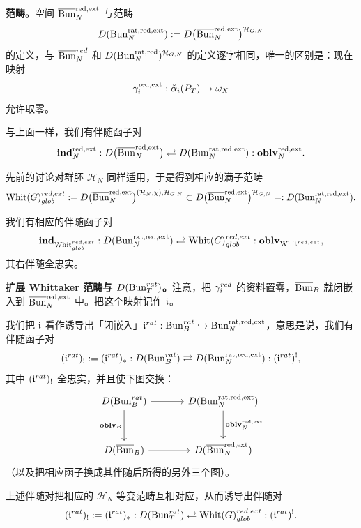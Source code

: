 \textbf{范畴。}空间 $\overline{\operatorname{Bun}}^{\mathrm{red},\mathrm{ext}}_N$ 与范畴
\[
  D(\operatorname{Bun}^{\mathrm{rat},\mathrm{red},\mathrm{ext}}_N)
  := D\bigl(\overline{\operatorname{Bun}}^{\mathrm{red},\mathrm{ext}}_N\bigr)^{\mathcal H_{G,N}}
\]
的定义，与 $\overline{\operatorname{Bun}}^{red}_N$ 和 $D(\operatorname{Bun}^{\mathrm{rat},\mathrm{red}}_N)^{\mathcal H_{G,N}}$ 的定义逐字相同，唯一的区别是：现在映射
\[
  \gamma_i^{\mathrm{red},\mathrm{ext}} : \check\alpha_i(P_T)\to\omega_X
\]
允许取零。

与上面一样，我们有伴随函子对
\[
  \mathbf{ind}_N^{\mathrm{red},\mathrm{ext}} :
  D\bigl(\overline{\operatorname{Bun}}^{\mathrm{red},\mathrm{ext}}_N\bigr)
  \rightleftarrows
  D(\operatorname{Bun}^{\mathrm{rat},\mathrm{red},\mathrm{ext}}_N) : \mathbf{oblv}_N^{\mathrm{red},\mathrm{ext}}.
\]

先前的讨论对群胚 $\mathcal H_N$ 同样适用，于是得到相应的满子范畴
\[
  \mathrm{Whit}(G)^{red,ext}_{glob} :=
  D\bigl(\overline{\operatorname{Bun}}^{\mathrm{red},\mathrm{ext}}_N\bigr)^{(\mathcal H_N,\chi),\mathcal H_{G,N}}
  \subset D\bigl(\overline{\operatorname{Bun}}^{\mathrm{red},\mathrm{ext}}_N\bigr)^{\mathcal H_{G,N}}
  =: D(\operatorname{Bun}^{\mathrm{rat},\mathrm{red},\mathrm{ext}}_N).
\]

我们有相应的伴随函子对
\[
  \mathbf{ind}_{\mathrm{Whit}^{red,ext}_{glob}} : D(\operatorname{Bun}^{\mathrm{rat},\mathrm{red},\mathrm{ext}}_N)
  \rightleftarrows \mathrm{Whit}(G)^{red,ext}_{glob} : \mathbf{oblv}_{\mathrm{Whit}^{red,ext}},
\]
其右伴随全忠实。

\textbf{扩展 Whittaker 范畴与 $D(\operatorname{Bun}^{rat}_T)$。}注意，把 $\gamma_i^{red}$ 的资料置零，$\overline{\mathrm{Bun}}_B$ 就闭嵌入到 $\overline{\operatorname{Bun}}^{\mathrm{red},\mathrm{ext}}_N$ 中。把这个映射记作 $\mathfrak{i}$。

我们把 $\mathfrak{i}$ 看作诱导出「闭嵌入」$\mathfrak{i}^{rat} : \operatorname{Bun}^{rat}_B\hookrightarrow \operatorname{Bun}^{\mathrm{rat},\mathrm{red},\mathrm{ext}}_N$，意思是说，我们有伴随函子对
\[
  (\mathfrak{i}^{rat})_! := (\mathfrak{i}^{rat})_* :
  D(\operatorname{Bun}^{rat}_B)\rightleftarrows D(\operatorname{Bun}^{\mathrm{rat},\mathrm{red},\mathrm{ext}}_N) : (\mathfrak{i}^{rat})^!,
\]
其中 $(\mathfrak{i}^{rat})_!$ 全忠实，并且使下图交换：
\[
\begin{tikzcd}[row sep=2.9em, column sep=3.4em, ampersand replacement=\&]
  D(\Bun\rt_B) \arrow[r] \arrow[d, "\oblv_B"'] \&
  D(\Bun^{\mathrm{rat},\mathrm{red},\mathrm{ext}}_N) \arrow[d, "\oblv_N^{\mathrm{red},\mathrm{ext}}"] \\
  D(\bBun_B) \arrow[r] \&
  D(\overline{\Bun}^{\mathrm{red},\mathrm{ext}}_N)
\end{tikzcd}
\]
（以及把相应函子换成其伴随后所得的另外三个图）。

上述伴随对把相应的 $\mathcal H_N$-等变范畴互相对应，从而诱导出伴随对
\[
  (\mathfrak{i}^{rat})_! := (\mathfrak{i}^{rat})_* :
  D(\operatorname{Bun}^{rat}_T)\rightleftarrows \mathrm{Whit}(G)^{red,ext}_{glob} : (\mathfrak{i}^{rat})^!.
\]

